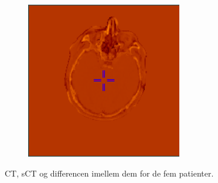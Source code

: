 \begin{figure}
\begin{subfigure}[b]{0.3\textwidth}
        \includegraphics[width=0.75\textwidth]{colager/loocv_ct/loocv_011030_sub.png}
        \label{col:loocv_ct_pat5_sub}
    \end{subfigure}
    \caption{CT, sCT og differencen imellem dem for de fem patienter.}
    \label{col:loocv_ct}
\end{figure}


